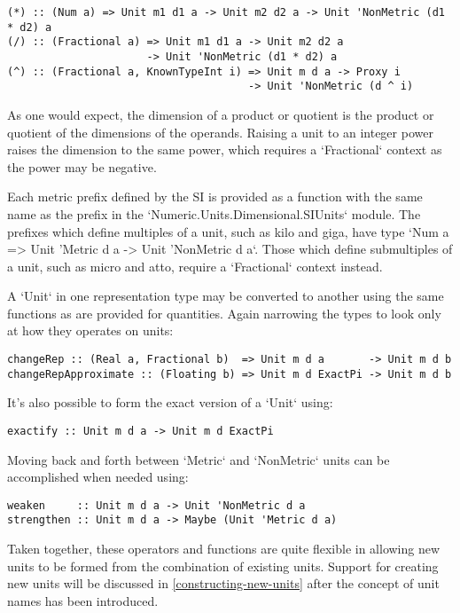 \documentclass[11pt]{report}
\begin{document}
\begin{lstlisting}
(*) :: (Num a) => Unit m1 d1 a -> Unit m2 d2 a -> Unit 'NonMetric (d1 * d2) a
(/) :: (Fractional a) => Unit m1 d1 a -> Unit m2 d2 a
                      -> Unit 'NonMetric (d1 * d2) a
(^) :: (Fractional a, KnownTypeInt i) => Unit m d a -> Proxy i
                                      -> Unit 'NonMetric (d ^ i)
\end{lstlisting}

As one would expect, the dimension of a product or quotient is the product or quotient of the dimensions of the operands.
Raising a unit to an integer power raises the dimension to the same power, which requires a `Fractional` context as the
power may be negative.

Each metric prefix defined by the SI is provided as a function with the same name as the prefix in the `Numeric.Units.Dimensional.SIUnits` module.
The prefixes which define multiples of a unit, such as kilo and giga, have type `Num a => Unit 'Metric d a -> Unit 'NonMetric d a`.
Those which define submultiples of a unit, such as micro and atto, require a `Fractional` context instead.

A `Unit` in one representation type may be converted to another using the same functions as are provided for quantities.
Again narrowing the types to look only at how they operates on units:

\begin{lstlisting}
changeRep :: (Real a, Fractional b)  => Unit m d a       -> Unit m d b
changeRepApproximate :: (Floating b) => Unit m d ExactPi -> Unit m d b
\end{lstlisting}

It's also possible to form the exact version of a `Unit` using:

\begin{lstlisting}
exactify :: Unit m d a -> Unit m d ExactPi
\end{lstlisting}

Moving back and forth between `Metric` and `NonMetric` units can be accomplished when needed using:

\begin{lstlisting}
weaken     :: Unit m d a -> Unit 'NonMetric d a
strengthen :: Unit m d a -> Maybe (Unit 'Metric d a)
\end{lstlisting}

Taken together, these operators and functions are quite flexible in allowing new units to be formed from
the combination of existing units. Support for creating new units will be discussed in \ref{constructing-new-units} after
the concept of unit names has been introduced.
\end{document}
